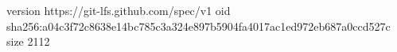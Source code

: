 version https://git-lfs.github.com/spec/v1
oid sha256:a04c3f72c8638e14bc785c3a324e897b5904fa4017ac1ed972eb687a0ccd527c
size 2112
